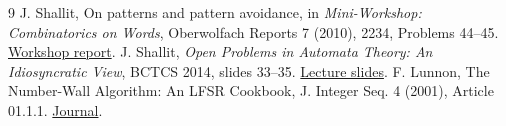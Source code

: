 \documentclass[11pt]{article}
\begin{document}
\begin{thebibliography}{9}
 J. Shallit, On patterns and pattern avoidance, in \emph{Mini-Workshop: Combinatorics on Words}, Oberwolfach Reports 7 (2010), 2234, Problems 44--45. \href{https://ems.press/content/serial-article-files/46296}{Workshop report}.
 J. Shallit, \emph{Open Problems in Automata Theory: An Idiosyncratic View}, BCTCS 2014, slides 33--35. \href{https://cs.uwaterloo.ca/~shallit/Talks/bc4.pdf}{Lecture slides}.
 F. Lunnon, The Number-Wall Algorithm: An LFSR Cookbook, J. Integer Seq. 4 (2001), Article 01.1.1. \href{https://cs.uwaterloo.ca/journals/JIS/VOL4/LUNNON/numbwall10.html}{Journal}.
\end{thebibliography}
\end{document}
